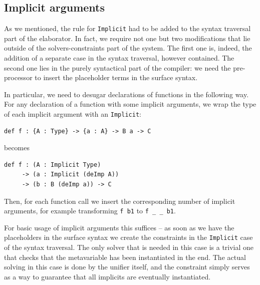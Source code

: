 \hypertarget{sec:case-implicits}{%
\subsection{Implicit arguments}\label{sec:case-implicits}}

As we mentioned, the rule for \texttt{Implicit} had to be added to the
syntax traversal part of the elaborator. In fact, we require not one but
two modifications that lie outside of the solvers-constraints part of
the system. The first one is, indeed, the addition of a separate case in
the syntax traversal, however contained. The second one lies in the
purely syntactical part of the compiler: we need the pre-processor to
insert the placeholder terms in the surface syntax.

In particular, we need to desugar declarations of functions in the
following way. For any declaration of a function with some implicit
arguments, we wrap the type of each implicit argument with an
\texttt{Implicit}:

\begin{verbatim}
def f : {A : Type} -> {a : A} -> B a -> C
\end{verbatim}

becomes

\begin{verbatim}
def f : (A : Implicit Type)
     -> (a : Implicit (deImp A))
     -> (b : B (deImp a)) -> C
\end{verbatim}

Then, for each function call we insert the corresponding number of
implicit arguments, for example transforming \texttt{f\ b1} to
\texttt{f\ \_\ \_\ b1}.

For basic usage of implicit arguments this suffices -- as soon as we
have the placeholders in the surface syntax we create the constraints in
the \texttt{Implicit} case of the syntax traversal. The only solver that
is needed in this case is a trivial one that checks that the
metavariable has been instantiated in the end. The actual solving in
this case is done by the unifier itself, and the constraint simply
serves as a way to guarantee that all implicits are eventually
instantiated.

